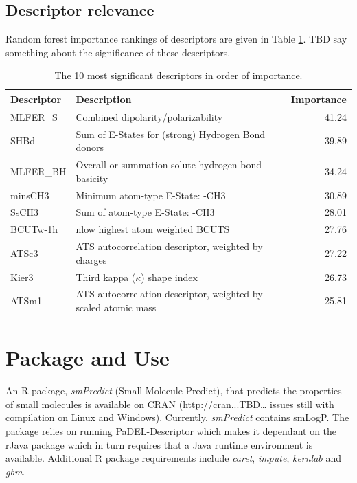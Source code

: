 \documentclass[10pt]{bmc_article}
\newenvironment{bmcformat}{\begin{raggedright}\baselineskip20pt\sloppy\setboolean{publ}{false}}{\end{raggedright}\baselineskip20pt\sloppy}
\begin{document}
\begin{bmcformat}
\subsection*{Descriptor relevance}
Random forest importance rankings of descriptors are given in Table \ref{tab:importance}. TBD say something about the significance of these descriptors.

\begin{table}[htbp]
  \centering
  \caption{The 10 most significant descriptors in order of importance.}
    \begin{tabular}{llr}
    \toprule
    Descriptor & Description & Importance \\
    \midrule
    MLFER\_S & Combined dipolarity/polarizability & 41.24 \\
    SHBd  & Sum of E-States for (strong) Hydrogen Bond donors & 39.89 \\
    MLFER\_BH & Overall or summation solute hydrogen bond basicity & 34.24 \\
    minsCH3 & Minimum atom-type E-State: -CH3 & 30.89 \\
    SsCH3 & Sum of atom-type E-State: -CH3 & 28.01 \\
    BCUTw-1h & nlow highest atom weighted BCUTS  & 27.76 \\
    ATSc3 & ATS autocorrelation descriptor, weighted by charges & 27.22 \\
    Kier3 & Third kappa ($\kappa$) shape index  & 26.73 \\
    ATSm1 & ATS autocorrelation descriptor, weighted by scaled atomic mass & 25.81 \\
    \bottomrule
    \end{tabular}%
  \label{tab:importance}%
\end{table}%

\section*{Package and Use}

An R package, \textit{smPredict} (Small Molecule Predict), that predicts the properties of small molecules is available on CRAN (http://cran...TBD… issues still with compilation on Linux and Windows). Currently, \textit{smPredict} contains smLogP. The package relies on running PaDEL-Descriptor which makes it dependant on the rJava package \cite{rJava} which in turn requires that a Java runtime environment is available. Additional R package requirements include \textit{caret}, \textit{impute}, \textit{kernlab} and \textit{gbm}.


\end{bmcformat}
\end{document}
